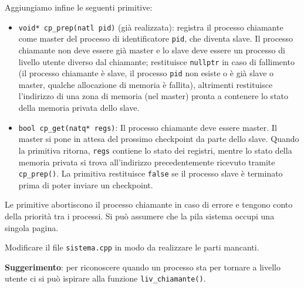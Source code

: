Aggiungiamo infine le seguenti primitive:
\begin{itemize}
  \item \verb|void* cp_prep(natl pid)| (gi\`a realizzata): registra il processo chiamante come master del processo di
    identificatore \verb|pid|, che diventa slave. Il processo chiamante non deve essere gi\`a master e lo
    slave deve essere un processo di livello utente diverso dal chiamante; restituisce \verb|nullptr| in caso
    di fallimento (il processo chiamante \`e slave, il processo \verb|pid| non esiste o \`e gi\`a slave o master,
    qualche allocazione di memoria \`e fallita), altrimenti restituisce l'indirizzo di una zona di memoria
    (nel master) pronta a contenere lo stato della memoria privata dello slave.
  \item \verb|bool cp_get(natq* regs)|: Il processo chiamante deve essere master. Il master si pone in attesa
    del prossimo checkpoint da parte dello slave. Quando la primitiva ritorna, \verb|regs| contiene lo stato
    dei registri, mentre lo stato della memoria privata si trova all'indirizzo precedentemente ricevuto
    tramite \verb|cp_prep()|. La primitiva restituisce \verb|false| se il processo slave \`e terminato
    prima di poter inviare un checkpoint.
\end{itemize}

Le primitive abortiscono il processo chiamante in caso di errore e tengono conto della priorit\`a tra i processi.
Si pu\`o assumere che la pila sistema occupi una singola pagina.

Modificare il file \verb|sistema.cpp| in modo da realizzare le parti mancanti.

{\bf Suggerimento}: per riconoscere quando un processo sta per tornare a livello utente ci si
pu\`o ispirare alla funzione \verb|liv_chiamante()|.
